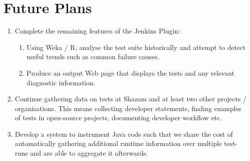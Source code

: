 \newpage

\section{Future Plans}

\begin{enumerate}
	\item{
		Complete the remaining features of the Jenkins Plugin:
	}
	\begin{enumerate}
		\item{
			Using Weka / R, analyse the test suite historically and attempt to detect useful trends such as common failure causes.
		}
		\item{
			Produce an output Web page that displays the \flaky tests and any relevant diagnostic information.
		}
	\end{enumerate}
	\item{
		Continue gathering data on \flaky tests at Shazam and at least two other projects / organisations. This means collecting developer statements, finding examples of \flaky tests in open-source projects, documenting developer workflow etc.
	}
	\item{
		Develop a system to instrument Java code such that we share the cost of automatically gathering additional runtime information over multiple test-runs and are able to aggregate it afterwards.
	}
\end{enumerate}

\newpage

\setcounter{section}{\value{oldSectionCounter}}
\setcounter{page}{\value{oldPageCounter}}
